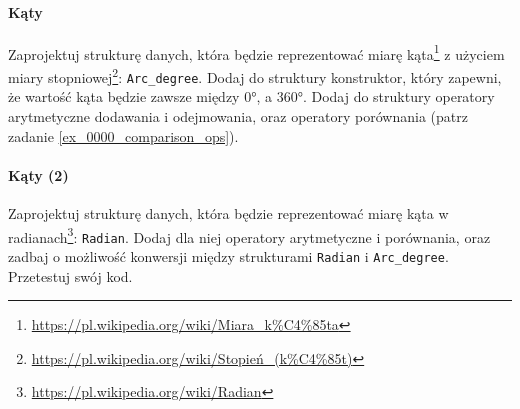 \documentclass[11pt,a4paper,titlepage,onecolumn]{article}
\begin{document}
\paragraph{Kąty} Zaprojektuj strukturę danych, która będzie reprezentować miarę
kąta\footnote{\url{https://pl.wikipedia.org/wiki/Miara_k\%C4\%85ta}} z użyciem miary
stopniowej\footnote{\url{https://pl.wikipedia.org/wiki/Stopień_(k\%C4\%85t)}}:
\texttt{Arc\_degree}.
Dodaj do struktury konstruktor, który zapewni, że wartość kąta będzie zawsze
między 0°, a 360°. Dodaj do struktury operatory arytmetyczne dodawania i
odejmowania, oraz operatory porównania (patrz zadanie
\ref{ex_0000_comparison_ops}).

\paragraph{Kąty (2)} Zaprojektuj strukturę danych, która będzie reprezentować
miarę kąta w radianach\footnote{\url{https://pl.wikipedia.org/wiki/Radian}}:
\texttt{Radian}. Dodaj dla niej operatory arytmetyczne i porównania, oraz zadbaj
o możliwość konwersji między strukturami \texttt{Radian} i \texttt{Arc\_degree}.
Przetestuj swój kod.



% 

% 

% 


% 

% 

% 


% 

% 

\end{document}
